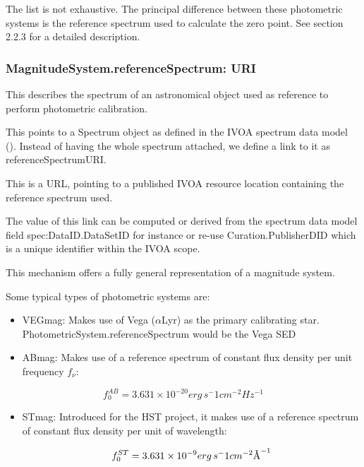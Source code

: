 \documentclass[11pt,a4paper]{ivoa}
\newcommand{\angstrom}{\mbox{\normalfont\AA}}
\begin{document}

The list is not exhaustive. The principal difference between these photometric systems is the reference spectrum used to calculate the zero point. See section 2.2.3 for a detailed description.
\par

\subsubsection{MagnitudeSystem.referenceSpectrum: URI}
This describes the spectrum of an astronomical object used as reference to perform photometric calibration.
\par

This points to a Spectrum object as defined in the IVOA spectrum data model (\citep{mcdowell2012ivoa}). Instead of having the whole spectrum attached, we define a link to it as referenceSpectrumURI.
\par

This is a URL, pointing to a published IVOA resource location containing the reference spectrum used.
\par

The value of this link can be computed or derived from the spectrum data model field spec:DataID.DataSetID for instance or re-use Curation.PublisherDID which is a unique identifier within the IVOA scope.
\par

This mechanism offers a fully general representation of a magnitude system.\par

Some typical types of photometric systems are:
\par

\begin{itemize}
	\item VEGmag: Makes use of Vega ($\alpha $Lyr) as the primary calibrating star. PhotometricSystem.referenceSpectrum would be the Vega SED\par

	\item ABmag: Makes use of a reference spectrum of constant flux density per unit frequency $f_\nu $:
\end{itemize}\par
\[
f_0^{AB} = 3.631 \times 10^{-20} erg\, s^-1 cm^{-2} Hz^{-1}
\]

\begin{itemize}
	\item STmag: Introduced for the HST project, it makes use of a reference spectrum of constant flux density per unit of wavelength:\par
\[
f_0^{ST} = 3.631 \times 10^{-9} erg\, s^-1 cm^{-2} \angstrom ^{-1}
\]
\end{itemize}
\end{document}
